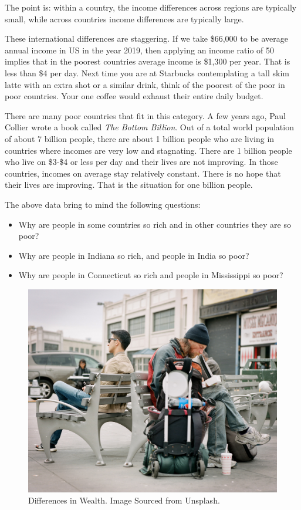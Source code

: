 \documentclass[
]{book}
\providecommand{\tightlist}{%
  \setlength{\itemsep}{0pt}\setlength{\parskip}{0pt}}
\begin{document}
The point is: within a country, the income differences across regions are typically small, while across countries income differences are typically large.

These international differences are staggering. If we take \$66,000 to be average annual income in US in the year 2019, then applying an income ratio of 50 implies that in the poorest countries average income is \$1,300 per year. That is less than \$4 per day. Next time you are at Starbucks contemplating a tall skim latte with an extra shot or a similar drink, think of the poorest of the poor in poor countries. Your one coffee would exhaust their entire daily budget.

There are many poor countries that fit in this category. A few years ago, Paul Collier wrote a book called \emph{The Bottom Billion}. Out of a total world population of about 7 billion people, there are about 1 billion people who are living in countries where incomes are very low and stagnating. There are 1 billion people who live on \$3-\$4 or less per day and their lives are not improving. In those countries, incomes on average stay relatively constant. There is no hope that their lives are improving. That is the situation for one billion people.

The above data bring to mind the following questions:

\begin{itemize}
\tightlist
\item
  Why are people in some countries so rich and in other countries they are so poor?
\item
  Why are people in Indiana so rich, and people in India so poor?
\item
  Why are people in Connecticut so rich and people in Mississippi so poor?
\end{itemize}

\begin{figure}

{\centering \includegraphics[width=0.5\linewidth]{img/growth/fig1} 

}

\caption{Differences in Wealth. Image Sourced from Unsplash.}\label{fig:growth01}
\end{figure}
\end{document}
